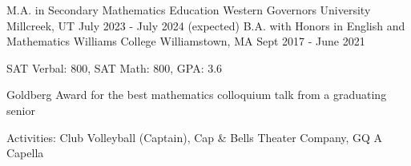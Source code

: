 \begin{cventries}
  \cventry
  {M.A. in Secondary Mathematics Education}
  {Western Governors University}
  {Millcreek, UT}
  {July 2023 - July 2024 (expected)}
  {}
  \cventry
  {B.A. with Honors in English and Mathematics}
  {Williams College}
  {Williamstown, MA}
  {Sept 2017 - June 2021}
  {
    \begin{cvitems}
      \item {SAT Verbal: 800, SAT Math: 800, GPA: 3.6}
      \item {Goldberg Award for the best mathematics colloquium talk from a graduating senior}
      \item {Activities: Club Volleyball (Captain), Cap \& Bells Theater Company, GQ A Capella}
    \end{cvitems}
  }
\end{cventries}

